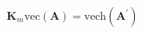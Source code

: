 \begin{equation}
   \mathbf{K}_{m} \mathrm{vec} \left( \mathbf{A} \right)
   =
   \mathrm{vech} \left( \mathbf{A}^{\prime} \right)
\end{equation}
